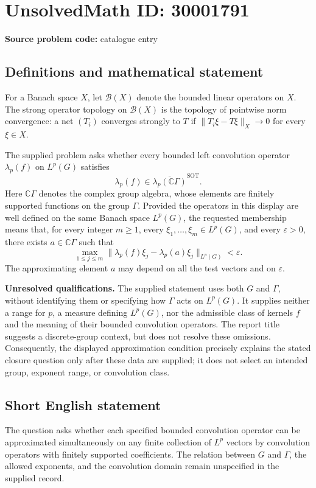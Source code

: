 \documentclass[11pt]{article}
\newcommand{\C}{\mathbb{C}}
\begin{document}
\section*{UnsolvedMath ID: 30001791}
\textbf{Source problem code:} catalogue entry
\subsection{Definitions and mathematical statement}
For a Banach space \(X\), let \(\mathcal B(X)\) denote the bounded linear operators on \(X\). The strong operator topology on \(\mathcal B(X)\) is the topology of pointwise norm convergence: a net \((T_i)\) converges strongly to \(T\) if \(\|T_i\xi-T\xi\|_X\to0\) for every \(\xi\in X\).

The supplied problem asks whether every bounded left convolution operator \(\lambda_p(f)\) on \(L^p(G)\) satisfies
\[
\lambda_p(f)\in\overline{\lambda_p(\C\Gamma)}^{\mathrm{SOT}}.
\]
Here \(\C\Gamma\) denotes the complex group algebra, whose elements are finitely supported functions on the group \(\Gamma\). Provided the operators in this display are well defined on the same Banach space \(L^p(G)\), the requested membership means that, for every integer \(m\geq1\), every \(\xi_1,\ldots,\xi_m\in L^p(G)\), and every \(\varepsilon>0\), there exists \(a\in\C\Gamma\) such that
\[
\max_{1\leq j\leq m}
\bigl\|\lambda_p(f)\xi_j-\lambda_p(a)\xi_j\bigr\|_{L^p(G)}<\varepsilon.
\]
The approximating element \(a\) may depend on all the test vectors and on \(\varepsilon\).

\textbf{Unresolved qualifications.} The supplied statement uses both \(G\) and \(\Gamma\), without identifying them or specifying how \(\Gamma\) acts on \(L^p(G)\). It supplies neither a range for \(p\), a measure defining \(L^p(G)\), nor the admissible class of kernels \(f\) and the meaning of their bounded convolution operators. The report title suggests a discrete-group context, but does not resolve these omissions. Consequently, the displayed approximation condition precisely explains the stated closure question only after these data are supplied; it does not select an intended group, exponent range, or convolution class.
\subsection{Short English statement}
The question asks whether each specified bounded convolution operator can be approximated simultaneously on any finite collection of \(L^p\) vectors by convolution operators with finitely supported coefficients. The relation between \(G\) and \(\Gamma\), the allowed exponents, and the convolution domain remain unspecified in the supplied record.
\end{document}
